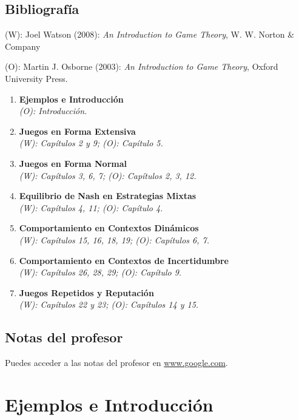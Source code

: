 \section*{Bibliografía}

(W): Joel Watson (2008): \textit{An Introduction to Game Theory}, W. W. Norton \& Company

(O): Martin J. Osborne (2003): \textit{An Introduction to Game Theory}, Oxford University Press. \\

\begin{enumerate}
    \item \textbf{Ejemplos e Introducción} \\
          \textit{(O): Introducción.}
    \item \textbf{Juegos en Forma Extensiva} \\
          \textit{(W): Capítulos 2 y 9; (O): Capítulo 5.}
    \item \textbf{Juegos en Forma Normal} \\
          \textit{(W): Capítulos 3, 6, 7; (O): Capítulos 2, 3, 12.}
    \item \textbf{Equilibrio de Nash en Estrategias Mixtas} \\
          \textit{(W): Capítulos 4, 11; (O): Capítulo 4.}
    \item \textbf{Comportamiento en Contextos Dinámicos} \\
          \textit{(W): Capítulos 15, 16, 18, 19; (O): Capítulos 6, 7.}
    \item \textbf{Comportamiento en Contextos de Incertidumbre} \\
          \textit{(W): Capítulos 26, 28, 29; (O): Capítulo 9.}
    \item \textbf{Juegos Repetidos y Reputación} \\
          \textit{(W): Capítulos 22 y 23; (O): Capítulos 14 y 15.}
\end{enumerate}

\section*{Notas del profesor}

Puedes acceder a las notas del profesor en \href{www.google.com}{www.google.com}.

\chapter{Ejemplos e Introducción}